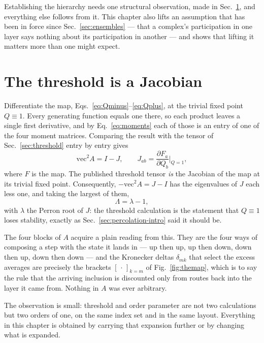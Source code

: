 Establishing the hierarchy needs one structural observation, made in
Sec.~\ref{sec:jacobian}, and everything else follows from it. This chapter also
lifts an assumption that has been in force since Sec.~\ref{sec:ensembles} ---
that a complex's participation in one layer says nothing about its
participation in another --- and shows that lifting it matters more than one
might expect.

\section{The threshold is a Jacobian}
\label{sec:jacobian}

Differentiate the map, Eqs.~\eqref{eq:Qminus}--\eqref{eq:Qplus}, at the trivial
fixed point $Q\equiv1$. Every generating function equals one there, so each
product leaves a single first derivative, and by Eq.~\eqref{eq:moments} each of
those is an entry of one of the four moment matrices. Comparing the result with
the tensor of Sec.~\ref{sec:threshold} entry by entry gives
\begin{equation}
  \mathrm{vec}^{2}A=I-J,
  \qquad
  J_{ab}=\frac{\partial F_{a}}{\partial Q_{b}}\bigg|_{Q=1},
  \label{eq:AisJ}
\end{equation}
where $F$ is the map. The published threshold tensor \emph{is} the Jacobian of
the map at its trivial fixed point. Consequently, $-\mathrm{vec}^{2}A=J-I$ has
the eigenvalues of $J$ each less one, and taking the largest of them,
\begin{equation}
  \Lambda=\lambda-1,
  \label{eq:Lambdalambda}
\end{equation}
with $\lambda$ the Perron root of $J$: the threshold calculation is the
statement that $Q\equiv1$ loses stability, exactly as
Sec.~\ref{sec:percolation-intro} said it should be.

The four blocks of $A$ acquire a plain reading from this. They are the four ways
of composing a step with the state it lands in --- up then up, up then down,
down then up, down then down --- and the Kronecker deltas $\delta_{mk}$ that
select the excess averages are precisely the brackets $[\,\cdot\,]_{k=m}$ of
Fig.~\ref{fig:themap}, which is to say the rule that the arriving inclusion is
discounted only from routes back into the layer it came from. Nothing in $A$ was
ever arbitrary.

The observation is small: threshold and order
parameter are not two calculations but two orders of one, on the same index set and in the same layout. Everything in this chapter is
obtained by carrying that expansion further or by changing what is expanded.


